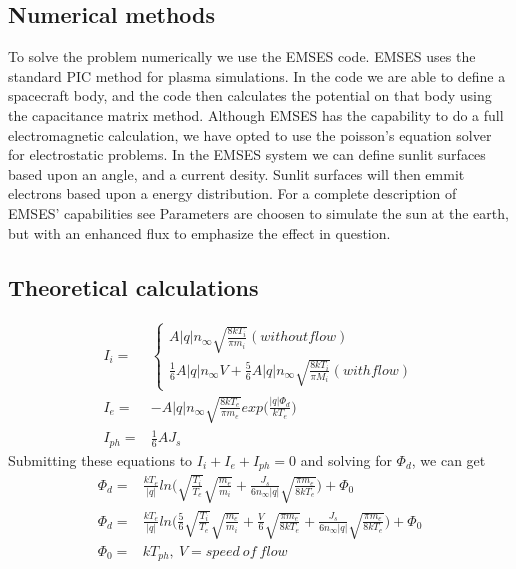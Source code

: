 \subsection{Numerical methods}

To solve the problem numerically we use the EMSES code. EMSES uses the standard PIC method for plasma simulations.
In the code we are able to define a spacecraft body, and the code then calculates the potential on that body using the capacitance matrix method.
Although EMSES has the capability to do a full electromagnetic calculation, we have opted to use the poisson's equation
solver for electrostatic problems. In the EMSES system we can define sunlit surfaces based upon an angle, and a current
desity. Sunlit surfaces will then emmit electrons based upon a energy distribution. For a complete description of EMSES' capabilities
see \citep{nakashima_ohhelp:_2009} Parameters are choosen to simulate the sun at the earth, but with an enhanced flux to emphasize the effect in question.

\subsection{Theoretical calculations}

\begin{equation}
\begin{split}
 I_i = &
    \left\{\begin{array}{ccc}
       A|q|n_\infty\sqrt{\frac{8 k T_i}{\pi m_i}} (without flow)\\
       \frac{1}{6}A |q|n_\infty V + \frac{5}{6} A |q| n_\infty \sqrt{\frac{8 k T_i}{\pi M_i}}(with flow)
      \end{array}\right. \\
  I_e = & -A|q|n_\infty \sqrt{\frac{8 k T_e}{\pi m_e}}exp\Big(\frac{|q|\Phi_d}{k T_e}\Big)\\
  I_{ph} = & \frac{1}{6} AJ_s
\end{split}
\label{thin sheet potential}
\end{equation}
Submitting these equations to \(I_i+I_e+I_{ph}=0\) and solving for $\Phi_d$, we can get
\begin{equation}
\begin{split}
 \Phi_d = & \frac{k T_e}{|q|}ln\Big(\sqrt{\frac{T_i}{T_e}}\sqrt{\frac{m_e}{m_i}}+\frac{J_s}{6 n_\infty |q|}\sqrt{\frac{\pi m_e}{8 k T_e}}\Big) + \Phi_0 \\
 \Phi_d = & \frac{k T_e}{|q|}ln\Big(\frac{5}{6}\sqrt{\frac{T_i}{T_e}}\sqrt{\frac{m_e}{m_i}}+\frac{V}{6}\sqrt{\frac{\pi m_e}{8 k T_e}} + \frac{J_s}{6 n_\infty |q|}\sqrt{\frac{\pi m_e}{8 k T_e}} \Big)+\Phi_0 \\
 \Phi_0 = & k T_{ph}, \ V = speed\ of\ flow
\end{split}
\label{thin sheet potential 2}
\end{equation}

